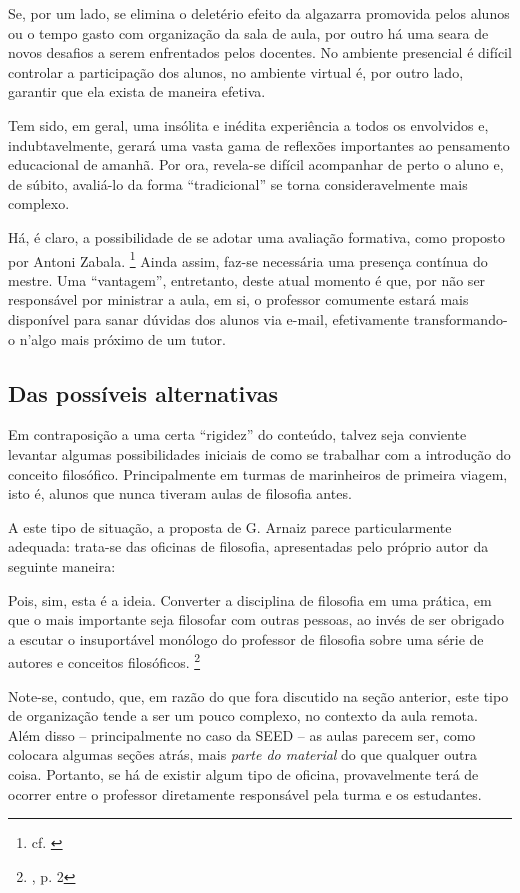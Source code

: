 \documentclass[12pt,a4paper]{article}
\newenvironment{citac}{\begin{addmargin}[4cm]{1em} \footnotesize}{\normalfont \end{addmargin}}
\begin{document}
	Se, por um lado, se elimina o deletério efeito da algazarra 
	promovida pelos alunos ou o tempo gasto com organização da sala de 
	aula, por outro há uma seara de novos desafios a serem enfrentados 
	pelos docentes. No ambiente presencial é difícil controlar a 
	participação dos alunos, no ambiente virtual é, por outro lado, 
	garantir que ela exista de maneira efetiva. 

	Tem sido, em geral, uma insólita e inédita experiência a todos os 
	envolvidos e, indubtavelmente, gerará uma vasta gama de reflexões 
	importantes ao pensamento educacional de amanhã. Por ora, revela-se 
	difícil acompanhar de perto o aluno e, de súbito, avaliá-lo da forma 
	``tradicional'' se torna consideravelmente mais complexo. 

	Há, é claro, a possibilidade de se adotar uma avaliação formativa, 
	como proposto por Antoni Zabala. \footnote{cf. \cite{zabala}}
	Ainda assim, faz-se necessária uma 
	presença contínua do mestre. Uma “vantagem”, entretanto, deste 
	atual momento é que, por não ser responsável por ministrar a aula, 
	em si, o professor comumente estará mais disponível para sanar 
	dúvidas dos alunos via e-mail, efetivamente transformando-o n'algo
	mais próximo de um tutor. 

	\subsection{Das possíveis alternativas}

	Em contraposição a uma certa “rigidez” do conteúdo, talvez seja 
	conviente levantar algumas possibilidades iniciais de como se 
	trabalhar com a introdução do conceito filosófico. Principalmente 
	em turmas de marinheiros de primeira viagem, isto é, alunos que 
	nunca tiveram aulas de filosofia antes. 

	A este tipo de situação, a proposta de G. Arnaiz parece 
	particularmente adequada: trata-se das oficinas de filosofia, 
	apresentadas pelo próprio autor da seguinte maneira: 

	\begin{citac}
		Pois, sim, esta é a ideia. Converter a disciplina de 
		filosofia em uma prática, em que o mais importante seja 
		filosofar com outras pessoas, ao invés de ser obrigado 
		a escutar o insuportável monólogo do professor de 
		filosofia sobre uma série de autores e conceitos 
		filosóficos. 
		\footnote{\cite{arnaiz}, p. 2}
	\end{citac}

	Note-se, contudo, que, em razão do que fora discutido na seção 
	anterior, este tipo de organização tende a ser um pouco complexo, 
	no contexto da aula remota. Além disso -- principalmente no caso 
	da SEED -- as aulas parecem ser, como colocara algumas seções 
	atrás, mais \textit{parte do material} do que qualquer outra coisa. 
	Portanto, se há de existir algum tipo de oficina, provavelmente 
	terá de ocorrer entre o professor diretamente responsável pela 
	turma e os estudantes. 
\end{document}
